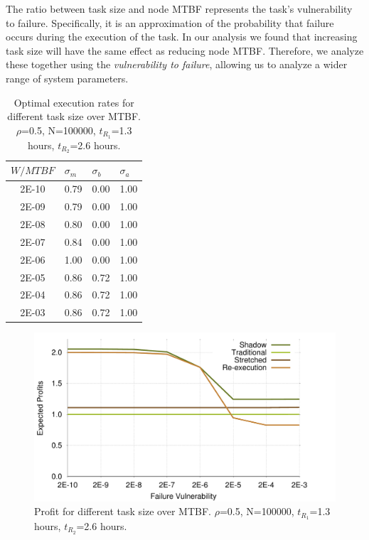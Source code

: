 The ratio between task size and node MTBF represents the task's
vulnerability to failure. Specifically, it is an approximation of the
probability that failure occurs during the execution of the task. In our
analysis we found that increasing task size will have the same effect
as reducing node MTBF. Therefore, we analyze these together using the
\textit{vulnerability to failure}, allowing us to analyze a wider range of
system parameters.

\begin{table}[!h]\small
	\caption{Optimal execution rates for different task size over MTBF. $\rho$=0.5, N=100000, $t_{R_1}$=1.3 hours, $t_{R_2}$=2.6 hours.}
	\centering
		\begin{tabular}{|c|p{1cm}|p{1cm}|p{1cm}|}
		\hline
		$W/MTBF$ & $\sigma_m$ & $\sigma_b$ & $\sigma_a$ \\
		\hline
		2E-10	&	0.79 &	0.00 &	1.00 \\
		\hline
		2E-09	&	0.79 &	0.00 &	1.00 \\
		\hline
		2E-08	&	0.80 &	0.00 &	1.00 \\
		\hline
		2E-07	&	0.84 &	0.00 &	1.00 \\
		\hline
		2E-06	&	1.00 &	0.00 &	1.00 \\
		\hline
		2E-05	&	0.86 &	0.72 &	1.00 \\
		\hline
		2E-04	&	0.86 &	0.72 &	1.00 \\
		\hline
		2E-03	&	0.86 &	0.72 &	1.00 \\
		\hline
		\end{tabular}
	\label{tbl:mtbf}
\end{table}

\begin{figure}[!h]	
	\begin{center}
			\includegraphics[width=\columnwidth]{Figures/mtbf_profit}
	\end{center}
	\caption{Profit for different task size over MTBF. $\rho$=0.5, N=100000, $t_{R_1}$=1.3 hours, $t_{R_2}$=2.6 hours.}
	\label{fig:mtbf}
\end{figure}

